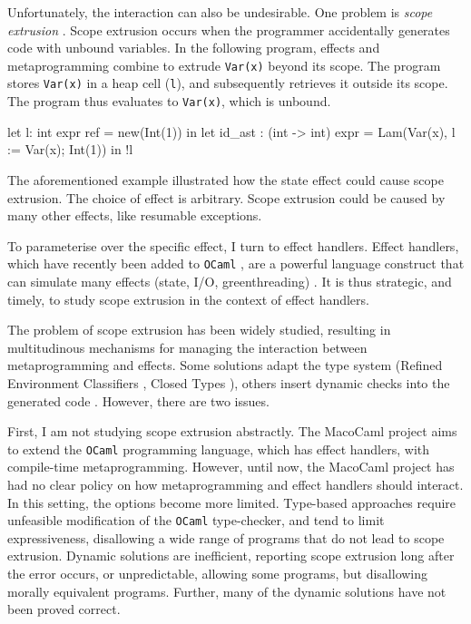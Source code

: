Unfortunately, the interaction can also be undesirable. One problem is \textit{scope extrusion} \citep{kiselyov-14}. Scope extrusion occurs when the programmer accidentally generates code with unbound variables. In the following program, effects and metaprogramming combine to extrude \texttt{Var(x)} beyond its scope. The program stores \texttt{Var(x)} in a heap cell (\texttt{l}), and subsequently retrieves it outside its scope. The program thus evaluates to \texttt{Var(x)}, which is unbound.

\begin{ocaml}
let l: int expr ref = new(Int(1)) in 
let id_ast : (int -> int) expr = Lam(Var(x), l := Var(x); Int(1)) in
!l
\end{ocaml} 

The aforementioned example illustrated how the state effect could cause scope extrusion. The choice of effect is arbitrary. Scope extrusion could be caused by many other effects, like resumable exceptions.

To parameterise over the specific effect, I turn to effect handlers. Effect handlers, which have recently been added to \texttt{OCaml} \citep{sivaramakrishnan-21}, are a powerful language construct that can simulate many effects (state, I/O, greenthreading) \citep{pretnar-15}. It is thus strategic, and timely, to study scope extrusion in the context of effect handlers. 

The problem of scope extrusion has been widely studied, resulting in multitudinous mechanisms for managing the interaction between metaprogramming and effects. Some solutions adapt the type system (Refined Environment Classifiers \citep{kiselyov-16,isoda-24}, Closed Types \citep{calcagno-00}), others insert dynamic checks into the generated code \citep{kiselyov-14}. However, there are two issues.

First, I am not studying scope extrusion abstractly. The MacoCaml \citep{xie-2022} project aims to extend the \texttt{OCaml} programming language, which has effect handlers, with compile-time metaprogramming. However, until now, the MacoCaml project has had no clear policy on how metaprogramming and effect handlers should interact. In this setting, the options become more limited. Type-based approaches require unfeasible modification of the \texttt{OCaml} type-checker, and tend to limit expressiveness, disallowing a wide range of programs that do not lead to scope extrusion. Dynamic solutions are inefficient, reporting scope extrusion long after the error occurs, or unpredictable, allowing some programs, but disallowing morally equivalent programs. Further, many of the dynamic solutions have not been proved correct.

